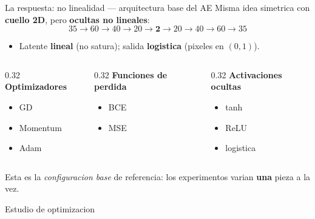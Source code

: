\documentclass[aspectratio=169, 10pt]{beamer}
\begin{document}
\begin{frame}{La respuesta: no linealidad --- arquitectura base del AE}
  Misma idea simetrica con \textbf{cuello 2D}, pero \textbf{ocultas no lineales}:
  \[ 35 \to 60 \to 40 \to 20 \to \mathbf{2} \to 20 \to 40 \to 60 \to 35 \]
  \begin{itemize}
    \item Latente \textbf{lineal} (no satura); salida \textbf{logistica} (pixeles en $(0,1)$).
  \end{itemize}

  \vspace{0.5em}
  \begin{columns}[T]
    \begin{column}{0.32\textwidth}
      \textbf{Optimizadores}
      \begin{itemize}
        \item GD
        \item Momentum
        \item Adam
      \end{itemize}
    \end{column}
    \begin{column}{0.32\textwidth}
      \textbf{Funciones de perdida}
      \begin{itemize}
        \item BCE
        \item MSE
      \end{itemize}
    \end{column}
    \begin{column}{0.32\textwidth}
      \textbf{Activaciones ocultas}
      \begin{itemize}
        \item tanh
        \item ReLU
        \item logistica
      \end{itemize}
    \end{column}
  \end{columns}

  \vspace{0.5em}
  {\footnotesize Esta es la \emph{configuracion base} de referencia: los
   experimentos varian \textbf{una} pieza a la vez.}
\end{frame}


\begin{frame}[standout]
  Estudio de optimizacion
\end{frame}
\end{document}
